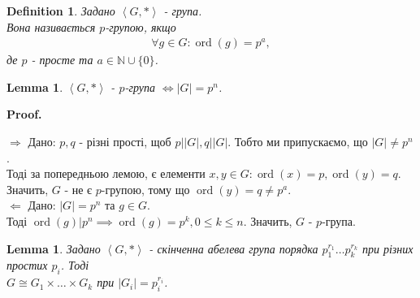 \documentclass[a4paper, 10pt]{article}
\makeatletter
\def\rightproof{$\boxed{\Rightarrow}$ }
\def\leftproof{$\boxed{\Leftarrow}$ }
\theoremstyle{theoremdd}
\theoremstyle{theoremdd}
\newtheorem{definition}[theorem]{Definition}
\theoremstyle{theoremdd}
\theoremstyle{theoremdd}
\theoremstyle{theoremdd}
\theoremstyle{theoremdd}
\theoremstyle{theoremdd}
\theoremstyle{theoremdd}
\theoremstyle{theoremdd}
\theoremstyle{theoremdd}
\theoremstyle{theoremdd}
\theoremstyle{theoremdd}
\theoremstyle{theoremdd}
\newtheorem{lemma}[theorem]{Lemma}
\theoremstyle{theoremdd}
\theoremstyle{theoremdd}
\renewenvironment{proof}[1][Proof.\\]{\par
\pushQED{\hfill \qed}%
\normalfont \topsep6\p@\@plus6\p@\relax
\trivlist
\item\relax
{\bfseries
#1\@addpunct{.}}\hspace\labelsep\ignorespaces
}{%
\popQED\endtrivlist\@endpefalse
}
\DeclareMathOperator{\ord}{ord}
\makeatother
\begin{document}
\begin{definition}
Задано $\left<G,* \right>$ - група.\\
Вона називається $p$-групою, якщо
\begin{align*}
\forall g \in G: \ord(g) = p^a,
\end{align*}
де $p$ - просте та $a \in \mathbb{N} \cup \{0\}$.
\end{definition}

\begin{lemma}
$\left< G, *\right>$ - $p$-група $\iff |G| = p^n$.
\end{lemma}

\begin{proof}
\rightproof Дано: $p,q$ - різні прості, щоб $p | |G|, q | |G|$. Тобто ми припускаємо, що $|G| \neq p^n$.\\
Тоді за попередньою лемою, є елементи $x,y \in G: \ord(x) = p, \ord(y) = q$.\\
Значить, $G$ - не є $p$-групою, тому що $\ord(y) = q \neq p^a$.
\bigskip \\
\leftproof Дано: $|G| = p^n$ та $g \in G$.\\
Тоді $\ord(g) | p^n \implies \ord(g) = p^k, 0 \leq k \leq n$. Значить, $G$ - $p$-група.
\end{proof}

\begin{lemma}
Задано $\left< G,* \right>$ - скінченна абелева група порядка $p_1^{r_1} \dots p_k^{r_k}$ при різних простих $p_i$. Тоді\\
$G \cong G_1 \times \dots \times G_k$ при $|G_i| = p_i^{r_i}$.
\end{lemma}
\end{document}
